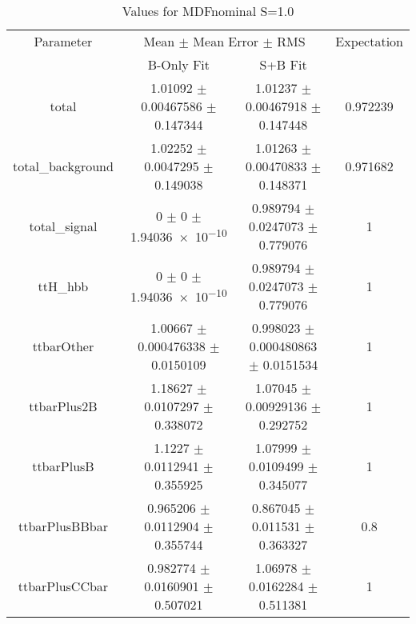 \begin{table}
\centering
\caption{Values for MDFnominal S=1.0}
\begin{tabular}{cccc}
\toprule
Parameter & \multicolumn{2}{c}{Mean $\pm$ Mean Error $\pm$ RMS} & Expectation\\
 & B-Only Fit & S+B Fit & \\
\midrule
total & \num{1.01092} $\pm$ \num{0.00467586} $\pm$ \num{0.147344} & \num{1.01237} $\pm$ \num{0.00467918} $\pm$ \num{0.147448} & \num{0.972239}\\
total\_background & \num{1.02252} $\pm$ \num{0.0047295} $\pm$ \num{0.149038} & \num{1.01263} $\pm$ \num{0.00470833} $\pm$ \num{0.148371} & \num{0.971682}\\
total\_signal & \num{0} $\pm$ \num{0} $\pm$ \num{1.94036e-10} & \num{0.989794} $\pm$ \num{0.0247073} $\pm$ \num{0.779076} & \num{1}\\
ttH\_hbb & \num{0} $\pm$ \num{0} $\pm$ \num{1.94036e-10} & \num{0.989794} $\pm$ \num{0.0247073} $\pm$ \num{0.779076} & \num{1}\\
ttbarOther & \num{1.00667} $\pm$ \num{0.000476338} $\pm$ \num{0.0150109} & \num{0.998023} $\pm$ \num{0.000480863} $\pm$ \num{0.0151534} & \num{1}\\
ttbarPlus2B & \num{1.18627} $\pm$ \num{0.0107297} $\pm$ \num{0.338072} & \num{1.07045} $\pm$ \num{0.00929136} $\pm$ \num{0.292752} & \num{1}\\
ttbarPlusB & \num{1.1227} $\pm$ \num{0.0112941} $\pm$ \num{0.355925} & \num{1.07999} $\pm$ \num{0.0109499} $\pm$ \num{0.345077} & \num{1}\\
ttbarPlusBBbar & \num{0.965206} $\pm$ \num{0.0112904} $\pm$ \num{0.355744} & \num{0.867045} $\pm$ \num{0.011531} $\pm$ \num{0.363327} & \num{0.8}\\
ttbarPlusCCbar & \num{0.982774} $\pm$ \num{0.0160901} $\pm$ \num{0.507021} & \num{1.06978} $\pm$ \num{0.0162284} $\pm$ \num{0.511381} & \num{1}\\
\bottomrule
\end{tabular}
\end{table}